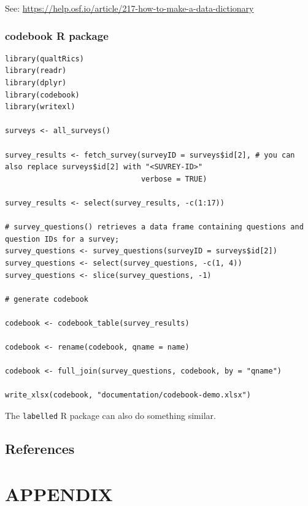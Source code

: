 \documentclass[
  letterpaper,
  DIV=11,
  numbers=noendperiod]{scrreprt}
\newlength{\cslhangindent}
\newenvironment{CSLReferences}[2] %
 {\begin{list}{}{%
  \setlength{\itemindent}{0pt}
  \setlength{\leftmargin}{0pt}
  \setlength{\parsep}{0pt}
  \ifodd #1
   \setlength{\leftmargin}{\cslhangindent}
   \setlength{\itemindent}{-1\cslhangindent}
  \fi
  \setlength{\itemsep}{#2\baselineskip}}}
 {\end{list}}
\begin{document}
See: \url{https://help.osf.io/article/217-how-to-make-a-data-dictionary}

\section*{codebook R package}\label{codebook-r-package}


\begin{verbatim}
library(qualtRics)
library(readr)
library(dplyr)
library(codebook)
library(writexl)

surveys <- all_surveys()

survey_results <- fetch_survey(surveyID = surveys$id[2], # you can also replace surveys$id[2] with "<SUVREY-ID>"
                               verbose = TRUE)

survey_results <- select(survey_results, -c(1:17))

# survey_questions() retrieves a data frame containing questions and question IDs for a survey;
survey_questions <- survey_questions(surveyID = surveys$id[2])
survey_questions <- select(survey_questions, -c(1, 4))
survey_questions <- slice(survey_questions, -1)
  
# generate codebook

codebook <- codebook_table(survey_results)

codebook <- rename(codebook, qname = name)

codebook <- full_join(survey_questions, codebook, by = "qname")

write_xlsx(codebook, "documentation/codebook-demo.xlsx")
\end{verbatim}

The \texttt{labelled} R package can also do something similar.


\chapter*{References}\label{references-2}


\label{refs}
\begin{CSLReferences}{0}{1}
\end{CSLReferences}

\part{APPENDIX}
\end{document}
